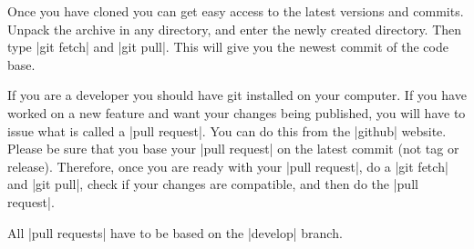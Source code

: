 Once you have cloned \shyfem{} you can get easy access to the latest
versions and commits. Unpack the archive in any directory, and enter
the newly created directory.
Then type |git fetch| and |git pull|. This will give you the newest
commit of the code base.

If you are a developer you should have git installed on your computer.
If you have worked on a new feature and want your changes being published,
you will have to issue what is called a |pull request|. You can do
this from the |github| website. Please be sure that you base your 
|pull request| on the latest commit (not tag or release). Therefore, once you
are ready with your |pull request|, do a |git fetch| and |git pull|,
check if your changes are compatible, and then do the |pull request|.

All |pull requests| have to be based on the |develop| branch.

